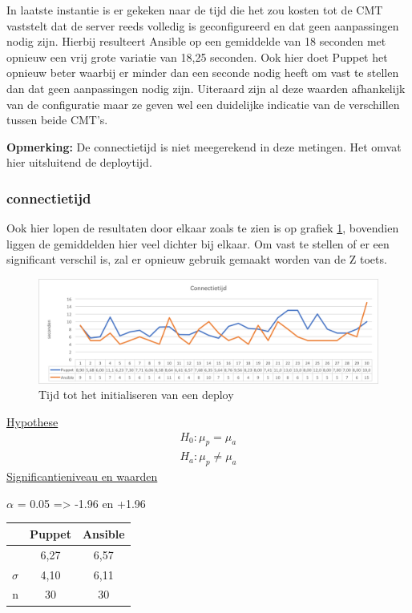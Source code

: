 In laatste instantie is er gekeken naar de tijd die het zou kosten tot de \gls{CMT} vaststelt dat de server reeds volledig is geconfigureerd en dat geen aanpassingen nodig zijn. Hierbij resulteert Ansible op een gemiddelde van 18 seconden met opnieuw een vrij grote variatie van 18,25 seconden. Ook hier doet Puppet het opnieuw beter waarbij er minder dan een seconde nodig heeft om vast te stellen dan dat geen aanpassingen nodig zijn. Uiteraard zijn al deze waarden afhankelijk van de configuratie maar ze geven wel een duidelijke indicatie van de verschillen tussen beide \gls{CMT}'s.

\textbf{Opmerking:} De \gls{connectietijd} is niet meegerekend in deze metingen. Het omvat hier uitsluitend de \gls{deploytijd}.
\subsubsection{\gls{connectietijd}}
Ook hier lopen de resultaten door elkaar zoals te zien is op grafiek \ref{fig:connectiontime}, bovendien liggen de gemiddelden hier veel dichter bij elkaar. Om vast te stellen of er een significant verschil is, zal er opnieuw gebruik gemaakt worden van de Z toets.
\begin{figure}
  \includegraphics[width=\linewidth]{img/connectiontime.png} 
  \caption{Tijd tot het initialiseren van een deploy}  
  \label{fig:connectiontime}
\end{figure}



\underline{Hypothese}
\begin{align*}
H_0:  \mu_p = \mu_a \\
H_a: \mu_p\neq \mu_a 
\end{align*}
\underline{Significantieniveau en waarden} \newline

 $\alpha$ = 0.05 => -1.96 en +1.96 \newline

		\begin{tabular}{ r |c |c }
			& Puppet & Ansible\\\hline
			\unexpanded{$ \bar x  $} &  6,27 & 6,57\\ \hline
			$\sigma$ & 4,10 & 6,11\\ \hline
			n &  30 &  30

\end{tabular}


